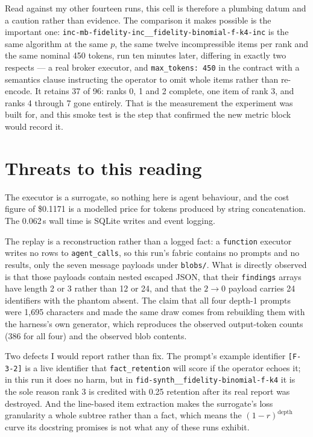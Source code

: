 \documentclass[11pt]{article}
\begin{document}
Read against my other fourteen runs, this cell is therefore a plumbing datum and a caution
rather than evidence. The comparison it makes possible is the important one:
\texttt{inc-mb-fidelity-inc\_\_fidelity-binomial-f-k4-inc} is the same algorithm at the same
$p$, the same twelve incompressible items per rank and the same nominal 450 tokens, run ten
minutes later, differing in exactly two respects --- a real broker executor, and
\texttt{max\_tokens: 450} in the contract with a semantics clause instructing the operator to
omit whole items rather than re-encode. It retains 37 of 96: ranks 0, 1 and 2 complete, one
item of rank 3, and ranks 4 through 7 gone entirely. That is the measurement the experiment
was built for, and this smoke test is the step that confirmed the new metric block would
record it.

\section{Threats to this reading}

The executor is a surrogate, so nothing here is agent behaviour, and the cost figure of
\$0.1171 is a modelled price for tokens produced by string concatenation. The 0.062\,s wall
time is SQLite writes and event logging.

The replay is a reconstruction rather than a logged fact: a \texttt{function} executor writes
no rows to \texttt{agent\_calls}, so this run's fabric contains no prompts and no results,
only the seven message payloads under \texttt{blobs/}. What is directly observed is that
those payloads contain nested escaped JSON, that their \texttt{findings} arrays have length
2 or 3 rather than 12 or 24, and that the $2\to0$ payload carries 24 identifiers with the
phantom absent. The claim that all four depth-1 prompts were 1{,}695 characters and made
the same draw comes from rebuilding them with the harness's own generator, which reproduces
the observed output-token counts (386 for all four) and the observed blob contents.

Two defects I would report rather than fix. The prompt's example identifier
\texttt{[F-3-2]} is a live identifier that \texttt{fact\_retention} will score if the
operator echoes it; in this run it does no harm, but in
\texttt{fid-synth\_\_fidelity-binomial-f-k4} it is the sole reason rank 3 is credited with
0.25 retention after its real report was destroyed. And the line-based item extraction makes
the surrogate's loss granularity a whole subtree rather than a fact, which means the
$(1-r)^{\text{depth}}$ curve its docstring promises is not what any of these runs exhibit.
\end{document}
